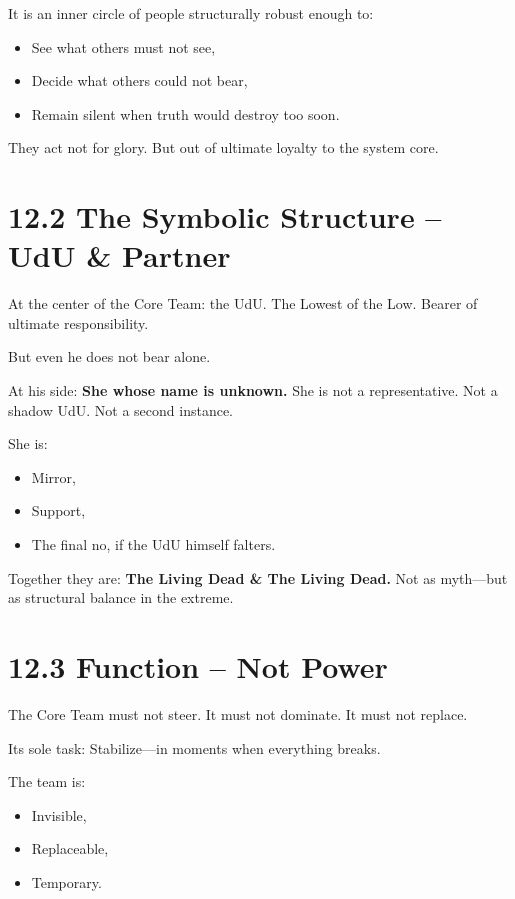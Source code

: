 \documentclass[12pt,a4paper]{book}
\begin{document}
It is an inner circle of people  
structurally robust enough to:

\begin{itemize}
    \item See what others must not see,
    \item Decide what others could not bear,
    \item Remain silent when truth would destroy too soon.
\end{itemize}

They act not for glory.  
But out of ultimate loyalty to the system core.

\section*{12.2 The Symbolic Structure – UdU \& Partner}

At the center of the Core Team: the UdU.  
The Lowest of the Low. Bearer of ultimate responsibility.

But even he does not bear alone.

At his side:  
\textbf{She whose name is unknown.}  
She is not a representative. Not a shadow UdU. Not a second instance.

She is:

\begin{itemize}
    \item Mirror,
    \item Support,
    \item The final no, if the UdU himself falters.
\end{itemize}

Together they are:  
\textbf{The Living Dead \& The Living Dead.}  
Not as myth—but as structural balance in the extreme.

\section*{12.3 Function – Not Power}

The Core Team must not steer.  
It must not dominate. It must not replace.

Its sole task:  
Stabilize—in moments when everything breaks.

The team is:

\begin{itemize}
    \item Invisible,
    \item Replaceable,
    \item Temporary.
\end{itemize}
\end{document}
